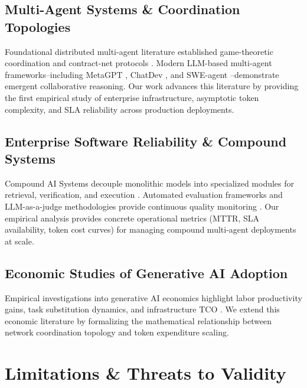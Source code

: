 \documentclass{article}
\begin{document}
\subsection{Multi-Agent Systems \& Coordination Topologies}

Foundational distributed multi-agent literature established game-theoretic coordination and contract-net protocols \cite{arxiv_2203_08975,arxiv_2010_11146}. Modern LLM-based multi-agent frameworks--including MetaGPT \cite{crossref_10_48550_arxiv_2308_00352}, ChatDev \cite{crossref_10_18653_v1_2024_acl_long_810}, and SWE-agent \cite{crossref_10_48550_arxiv_2405_15793}--demonstrate emergent collaborative reasoning. Our work advances this literature by providing the first empirical study of enterprise infrastructure, asymptotic token complexity, and SLA reliability across production deployments.


\subsection{Enterprise Software Reliability \& Compound Systems}

Compound AI Systems decouple monolithic models into specialized modules for retrieval, verification, and execution \cite{arxiv_2406_00584,crossref_10_1109_access_2026_3656309}. Automated evaluation frameworks and LLM-as-a-judge methodologies provide continuous quality monitoring \cite{arxiv_2411_15594,arxiv_2302_10809}. Our empirical analysis provides concrete operational metrics (MTTR, SLA availability, token cost curves) for managing compound multi-agent deployments at scale.


\subsection{Economic Studies of Generative AI Adoption}

Empirical investigations into generative AI economics highlight labor productivity gains, task substitution dynamics, and infrastructure TCO \cite{crossref_10_1201_9788743808145_14,crossref_10_1108_jeim_12_2025_1269}. We extend this economic literature by formalizing the mathematical relationship between network coordination topology and token expenditure scaling.




\section{Limitations \& Threats to Validity}
\end{document}
